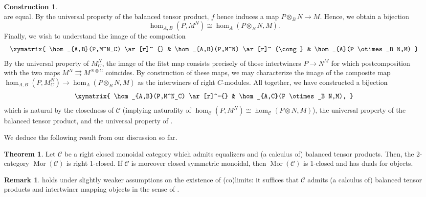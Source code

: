 \documentclass{article}
\newcommand{\Mor}{\operatorname{Mor}}%
\newcommand{\C}{\mathcal{C}}
\numberwithin{equation}{section}
\theoremstyle{definition}
\newtheorem{construction}[definition]{Construction}
\newtheorem{remark}[definition]{Remark}
\theoremstyle{theorem}
\newtheorem{theorem}[definition]{Theorem}
\begin{document}
\begin{construction}
\begin{equation}
    \end{equation}
    are equal. By the universal property of the balanced tensor product, $f$ hence induces a map $P \otimes_B N \to M$. Hence, we obtain a bijection 
    \begin{equation}
        \hom_{A,B}(P,M^N) \cong \hom_{A}(P \otimes_B N,M).
    \end{equation}
    Finally, we wish to understand the image of the composition 
    \begin{equation}
        \xymatrix{
            \hom_{A,B}(P,M^N_C) \ar[r]^-{} & \hom_{A,B}(P,M^N) \ar[r]^-{\cong} & \hom_{A}(P \otimes_B N,M)
        }
    \end{equation}
    By the universal property of $M^N_C$, the image of the fitst map consists precisely of those intertwiners $P \to N^M$ for which postcomposition 
    with the two maps $M^N \rightrightarrows M^{N \otimes C}$ coincides. By construction of these maps, we may characterize the image of the composite 
    map $\hom_{A,B}(P,M^N_C) \to \hom_{A}(P \otimes_B N,M)$ as the interwiners of right $C$-modules. All together, we have constructed a bijection 
    \begin{equation}\label{Equation: toward Morita closedness}
        \xymatrix{
            \hom_{A,B}(P,M^N_C) \ar[r]^-{} & \hom_{A,C}(P \otimes_B N,M),
        }
    \end{equation}
    which is natural by the closedness of $\C$ (implying naturality of $\hom_{\C}(P,M^N) \cong \hom_{\C}(P \otimes N,M)$), the universal property 
    of the balanced tensor product, and the universal property of . 
\end{construction}
We deduce the following result from our discussion so far. 
\begin{theorem}\label{Theorem: closedness of the Morita 2-category}
    Let $\C$ be a right closed monoidal category which admits equalizers and (a calculus of) balanced tensor products. Then, the 
    2-category $\Mor(\C)$ is right 1-closed. If $\C$ is moreover closed symmetric monoidal, then $\Mor(\C)$ is 1-closed and has duals for objects.
\end{theorem}
\begin{remark}
     holds under slightly weaker assumptions on the existence of (co)limits: it suffices that $\C$ admits 
    (a calculus of) balanced tensor products and intertwiner mapping objects in the sense of . 
\end{remark}
\end{document}
